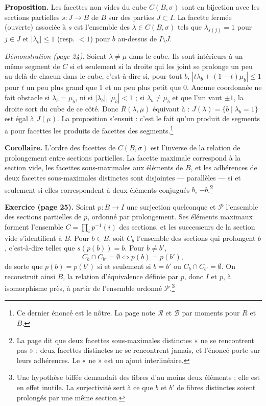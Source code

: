 \documentclass[11pt,a4paper]{article}
\begin{document}
\textbf{Proposition.} Les facettes non vides du cube $C(B, \sigma)$ sont en
bijection avec les sections partielles $s : J \to B$ de $B$ sur des parties
$J \subset I$. La facette fermée (ouverte) associée à $s$ est l'ensemble des
$\lambda \in C(B, \sigma)$ tels que $\lambda_{s(j)} = 1$ pour $j \in J$ et
$|\lambda_{b}| \leq 1$ (resp. $< 1$) pour $b$ au-dessus de $I \setminus J$.

\emph{Démonstration (page 24).} Soient $\lambda \neq \mu$ dans le cube. Ils sont
intérieurs à un même segment de $C$ si et seulement si la droite qui les joint
se prolonge un peu au-delà de chacun dans le cube, c'est-à-dire si, pour tout
$b$, $|t\lambda_{b} + (1-t)\mu_{b}| \leq 1$ pour $t$ un peu plus grand que 1 et
un peu plus petit que 0. Aucune coordonnée ne fait obstacle si
$\lambda_{b} = \mu_{b}$, ni si $|\lambda_{b}|, |\mu_{b}| < 1$ ; si
$\lambda_{b} \neq \mu_{b}$ et que l'un vaut $\pm 1$, la droite sort du cube de
ce côté. Donc $R(\lambda, \mu)$ équivaut à : $J(\lambda) = \{b \mid \lambda_{b}
= 1\}$ est égal à $J(\mu)$. La proposition s'ensuit : c'est le fait qu'un
produit de segments a pour facettes les produits de facettes des
segments.\footnote{Ce dernier énoncé est le nôtre. La page note
$\mathcal{R}$ et $\mathcal{B}$ par moments pour $R$ et $B$.}

\textbf{Corollaire.} L'ordre des facettes de $C(B, \sigma)$ est l'inverse de la
relation de prolongement entre sections partielles. La facette maximale
correspond à la section vide, les facettes sous-maximales aux éléments de $B$,
et les adhérences de deux facettes sous-maximales distinctes sont disjointes
--- parallèles --- si et seulement si elles correspondent à deux éléments
conjugués $b$, $-b$.\footnote{La page dit que deux facettes sous-maximales
distinctes « ne se rencontrent pas » ; deux facettes distinctes ne se
rencontrent jamais, et l'énoncé porte sur leurs adhérences. Le « ne » est un
ajout interlinéaire.}

\textbf{Exercice (page 25).} Soient $p : B \to I$ une surjection quelconque et
$\mathcal{P}$ l'ensemble des sections partielles de $p$, ordonné par
prolongement. Ses éléments maximaux forment l'ensemble
$C = \prod_{i} p^{-1}(i)$ des sections, et les successeurs de la section vide
s'identifient à $B$. Pour $b \in B$, soit $C_{b}$ l'ensemble des sections qui
prolongent $b$, c'est-à-dire telles que $s(p(b)) = b$. Pour $b \neq b'$,
\[
  C_{b} \cap C_{b'} = \emptyset \iff p(b) = p(b'),
\]
de sorte que $p(b) = p(b')$ si et seulement si $b = b'$ ou
$C_{b} \cap C_{b'} = \emptyset$. On reconstruit ainsi $B$, la relation
d'équivalence définie par $p$, donc $I$ et $p$, à isomorphisme près, à partir de
l'ensemble ordonné $\mathcal{P}$.\footnote{Une hypothèse biffée demandait des
fibres d'au moins deux éléments ; elle est en effet inutile. La surjectivité
sert à ce que $b$ et $b'$ de fibres distinctes soient prolongés par une même
section.}
\end{document}
